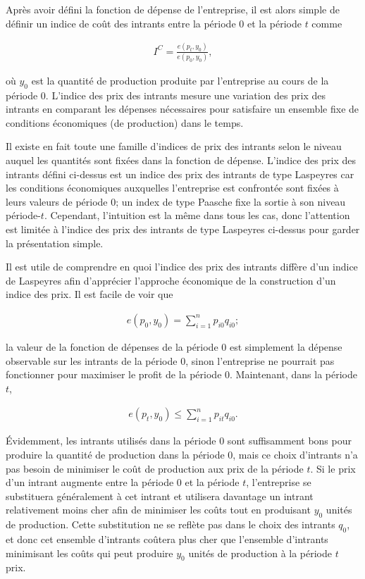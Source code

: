 \documentclass[
]{article}
\begin{document}
Après avoir défini la fonction de dépense de l'entreprise, il est alors simple de définir un indice de coût des intrants entre la période 0 et la période \(t\) comme

\begin{align*}
I^{C} = \frac{e(p_{t}, y_{0})}{e(p_{0}, y_{0})},
\end{align*}

où \(y_{0}\) est la quantité de production produite par l'entreprise au cours de la période 0. L'indice des prix des intrants mesure une variation des prix des intrants en comparant les dépenses nécessaires pour satisfaire un ensemble fixe de conditions économiques (de production) dans le temps.

Il existe en fait toute une famille d'indices de prix des intrants selon le niveau auquel les quantités sont fixées dans la fonction de dépense. L'indice des prix des intrants défini ci-dessus est un indice des prix des intrants de type Laspeyres car les conditions économiques auxquelles l'entreprise est confrontée sont fixées à leurs valeurs de période 0; un index de type Paasche fixe la sortie à son niveau période-\(t\). Cependant, l'intuition est la même dans tous les cas, donc l'attention est limitée à l'indice des prix des intrants de type Laspeyres ci-dessus pour garder la présentation simple.

Il est utile de comprendre en quoi l'indice des prix des intrants diffère d'un indice de Laspeyres afin d'apprécier l'approche économique de la construction d'un indice des prix. Il est facile de voir que

\begin{align*}
e(p_{0}, y_{0}) = \sum_{i = 1}^{n} p_{i0} q_{i0};
\end{align*}

la valeur de la fonction de dépenses de la période 0 est simplement la dépense observable sur les intrants de la période 0, sinon l'entreprise ne pourrait pas fonctionner pour maximiser le profit de la période 0. Maintenant, dans la période \(t\),

\begin{align*}
e(p_{t}, y_{0}) \leq \sum_{i = 1}^{n} p_{it} q_{i0}.
\end{align*}

Évidemment, les intrants utilisés dans la période 0 sont suffisamment bons pour produire la quantité de production dans la période 0, mais ce choix d'intrants n'a pas besoin de minimiser le coût de production aux prix de la période \(t\). Si le prix d'un intrant augmente entre la période 0 et la période \(t\), l'entreprise se substituera généralement à cet intrant et utilisera davantage un intrant relativement moins cher afin de minimiser les coûts tout en produisant \(y_{0}\) unités de production. Cette substitution ne se reflète pas dans le choix des intrants \(q_{0}\), et donc cet ensemble d'intrants coûtera plus cher que l'ensemble d'intrants minimisant les coûts qui peut produire \(y_{0}\) unités de production à la période \(t\) prix.
\end{document}
